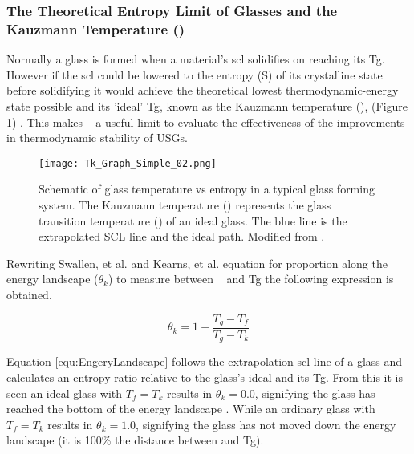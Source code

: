 \documentclass[a4paper,12pt,oneside]{report}%
\begin{document}
\subsubsection{The Theoretical Entropy Limit of Glasses and the Kauzmann Temperature (\Tk)}
Normally a glass is formed when a material's \gls{scl} solidifies on reaching its \gls{Tg}. However if the \gls{scl} could be lowered to the entropy (S) of its crystalline state before solidifying it would achieve the theoretical lowest thermodynamic-energy state possible and its 'ideal' \gls{Tg}, known as the Kauzmann temperature (\Tk),  (Figure \ref{fig:TkGraph}) \cite{Swallen2007, Kearns2008}.  This makes \Tk~ a useful limit to evaluate the effectiveness of the improvements in thermodynamic stability of USGs. 

\begin{figure}[htbp]
	\centering
	\texttt{[image: Tk\_Graph\_Simple\_02.png]}
	\caption[Schematic of glass temperature vs entropy in a typical glass forming system. The Kauzmann temperature (\Tk) represents the glass transition temperature (\Tg) of an ideal glass. The blue line is the extrapolated SCL line and the ideal path.]{Schematic of glass temperature vs entropy in a typical glass forming system. The Kauzmann temperature (\Tk) represents the glass transition temperature (\Tg) of an ideal glass. The blue line is the extrapolated SCL line and the ideal path. Modified from \cite{Kearns2008}.}
	\label{fig:TkGraph}
\end{figure}

Rewriting Swallen, et al. \cite{Swallen2007} and Kearns, et al. \cite{Kearns2008} equation for proportion along the energy landscape ($\theta_{k}$) to measure between \Tk~ and \gls{Tg} the following expression is obtained. 

\begin{equation}
\theta_{k} = 1 - \frac{T_{g}-T_{f}}{T_{g}-T_{k}}
\label{equ:EngeryLandscape}
\end{equation}

Equation \ref{equ:EngeryLandscape} follows the extrapolation \gls{scl} line of a glass and calculates an entropy ratio relative to the glass's ideal \Tk and its \gls{Tg}. From this it is seen an ideal glass with $T_{f}=T_{k}$ results in $\theta_{k}=0.0$, signifying the glass has reached the bottom of the energy landscape \cite{Swallen2007, Kearns2008}. While an ordinary glass with $T_{f}=T_{k}$ results in $\theta_{k}=1.0$, signifying the glass has not moved down the energy landscape (it is 100\% the distance between \Tk and \gls{Tg}).
\end{document}
